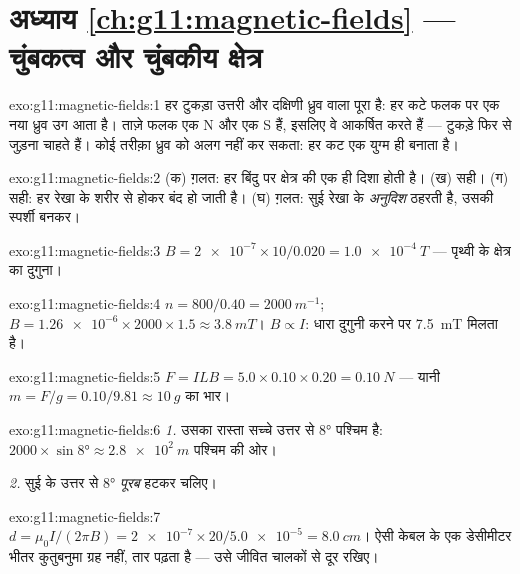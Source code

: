 \section*{अध्याय \ref{ch:g11:magnetic-fields} --- चुंबकत्व और चुंबकीय क्षेत्र}

\begin{solution}{exo:g11:magnetic-fields:1}
हर टुकड़ा उत्तरी और दक्षिणी ध्रुव वाला पूरा  है: हर कटे फलक पर एक
नया ध्रुव उग आता है। ताज़े फलक एक N और एक S हैं, इसलिए वे आकर्षित करते हैं ---
टुकड़े फिर से जुड़ना चाहते हैं। कोई तरीक़ा ध्रुव को अलग नहीं कर सकता: हर कट
एक युग्म ही बनाता है।
\end{solution}

\begin{solution}{exo:g11:magnetic-fields:2}
(क) ग़लत: हर बिंदु पर क्षेत्र की एक ही दिशा होती है। (ख) सही।
(ग) सही: हर रेखा  के शरीर से होकर बंद हो जाती है। (घ) ग़लत: सुई
रेखा के \emph{अनुदिश} ठहरती है, उसकी स्पर्शी बनकर।
\end{solution}

\begin{solution}{exo:g11:magnetic-fields:3}
$B = \num{2e-7} \times 10 / 0.020 = \qty{1.0e-4}{T}$ --- पृथ्वी के क्षेत्र का दुगुना।
\end{solution}

\begin{solution}{exo:g11:magnetic-fields:4}
$n = 800/0.40 = \qty{2000}{m^{-1}}$; $B = \num{1.26e-6} \times 2000 \times 1.5 \approx \qty{3.8}{mT}$। $B \propto I$: धारा दुगुनी करने पर \qty{7.5}{mT} मिलता है।
\end{solution}

\begin{solution}{exo:g11:magnetic-fields:5}
$F = ILB = 5.0 \times 0.10 \times 0.20 = \qty{0.10}{N}$ --- यानी $m = F/g = 0.10/9.81 \approx \qty{10}{g}$ का भार।
\end{solution}

\begin{solution}{exo:g11:magnetic-fields:6}
\emph{1.} उसका रास्ता सच्चे उत्तर से $\ang{8}$ पश्चिम है: $2000 \times \sin\ang{8} \approx \qty{2.8e2}{m}$ पश्चिम की ओर।

\emph{2.} सुई के उत्तर से $\ang{8}$ \emph{पूरब} हटकर चलिए।
\end{solution}

\begin{solution}{exo:g11:magnetic-fields:7}
$d = \mu_0 I / (2\pi B) = \num{2e-7} \times 20 / \num{5.0e-5}
= \qty{8.0}{cm}$। ऐसी केबल के एक डेसीमीटर भीतर कुतुबनुमा ग्रह नहीं, तार पढ़ता है ---
उसे जीवित चालकों से दूर रखिए।
\end{solution}

